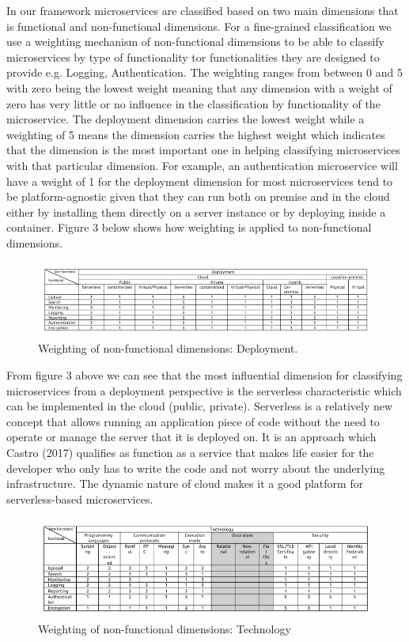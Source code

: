 \documentclass{article}
\begin{document}
In our framework microservices are classified based on two main dimensions that is functional and non-functional dimensions. For a fine-grained classification we use a weighting mechanism of non-functional dimensions to be able to classify microservices by type of functionality tor functionalities they are designed to provide e.g. Logging, Authentication. The weighting ranges from between 0 and 5 with zero being the lowest weight meaning that any dimension with a weight of zero has very little or no influence in the classification by functionality of the microservice. The deployment dimension carries the lowest weight while a weighting of 5 means the dimension carries the highest weight which indicates that the dimension is the most important one in helping classifying microservices with that particular dimension. For example, an authentication microservice will have a weight of 1 for the deployment dimension for most microservices tend to be platform-agnostic given that they can run both on premise and in the cloud either by installing them directly on a server instance or by deploying inside a container. Figure 3 below shows how weighting is applied to non-functional dimensions.

\begin{figure}[h!]
\includegraphics{table5.png}
\caption{Weighting of non-functional dimensions: Deployment.}
\end{figure}

From figure 3 above we can see that the most influential dimension for classifying microservices from a deployment perspective is the serverless characteristic which can be implemented in the cloud (public, private). Serverless is a relatively new concept that allows running an application piece of code without the need to operate or manage the server that it is deployed on. It is an approach which Castro (2017) qualifies as function as a service that makes life easier for the developer who only has to write the code and not worry about the underlying infrastructure. The dynamic nature of cloud makes it a good platform for serverless-based microservices. 

\begin{figure}[h!]
\includegraphics{table6.png}
\caption{Weighting of non-functional dimensions: Technology}
\end{figure}
\end{document}
